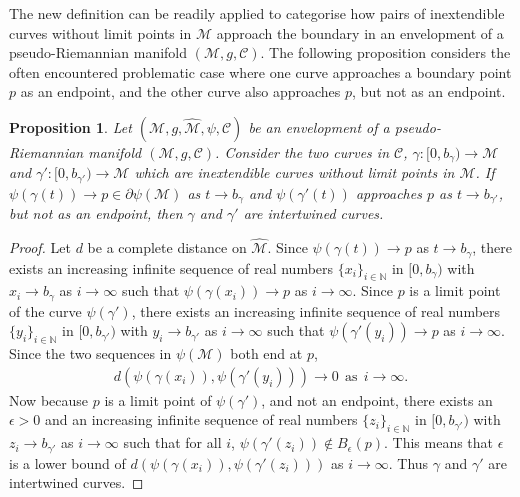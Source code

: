 \documentclass[pdflatex,sn-mathphys-num]{sn-jnl}
\newtheorem{prop}[theorem]{Proposition}
\theoremstyle{definition}
\begin{document}
The new definition can be readily applied to categorise how pairs of inextendible curves without limit points in $\mathcal{M}$ approach the boundary in an envelopment of a pseudo-Riemannian manifold  $(\mathcal{M},g,\mathcal{C})$. The following proposition considers the often encountered problematic case where one curve approaches a boundary point $p$ as an endpoint, and the other curve also approaches $p$, but not as an endpoint. 
\begin{prop}\label{prop:intertwined} 
    Let $(\mathcal{M},g,\hat{\mathcal{M}},\psi,\mathcal{C})$ be an envelopment of a pseudo-Riemannian manifold  $(\mathcal{M},g,\mathcal{C})$. Consider the two curves in $\mathcal{C}$, $\gamma:[0,b_{\gamma}) \rightarrow \mathcal{M}$ and $\gamma':[0,b_{\gamma'}) \rightarrow \mathcal{M}$ which are inextendible curves without limit points in $\mathcal{M}$. If $\psi(\gamma(t)) \rightarrow p \in  \partial\psi(\mathcal{M})$ as $t \rightarrow b_{\gamma}$ and $\psi(\gamma'(t))$ approaches $p$ as $t \rightarrow b_{\gamma'}$, but not as an endpoint, then $\gamma$ and $\gamma'$ are intertwined curves.
\end{prop}
\begin{proof}
    Let $d$ be a complete distance on $\hat{\mathcal{M}}$. Since $\psi(\gamma(t)) \rightarrow p$ as $t \rightarrow b_{\gamma}$, there exists an increasing infinite sequence of real numbers $\{x_i\}_{i \in \mathbb{N}}$ in $[0,b_{\gamma})$ with $x_i \rightarrow b_{\gamma}$ as $i \rightarrow \infty$ such that $\psi(\gamma(x_i)) \rightarrow p$ as $i \rightarrow \infty$. Since $p$ is a limit point of the curve $\psi(\gamma')$, there exists an increasing infinite sequence of real numbers $\{y_i\}_{i \in \mathbb{N}}$ in $[0,b_{\gamma'})$ with $y_i \rightarrow b_{\gamma'}$ as $i \rightarrow \infty$ such that $\psi(\gamma'(y_i)) \rightarrow p$ as $i \rightarrow \infty$. Since the two sequences in $\psi(\mathcal{M})$ both end at $p$, 
    \begin{align*}
        d(\psi(\gamma(x_i)),\psi(\gamma'(y_i))) \rightarrow 0~~\text{as}~~i \rightarrow \infty.
    \end{align*}
    Now because $p$ is a limit point of $\psi(\gamma')$, and not an endpoint, there exists an $\epsilon > 0$ and an increasing infinite sequence of real numbers $\{z_i\}_{i \in \mathbb{N}}$ in $[0,b_{\gamma'})$ with $z_i \rightarrow b_{\gamma'}$ as $i \rightarrow \infty$ such that for all $i$, $\psi(\gamma'(z_i)) \notin B_{\epsilon}(p)$. This means that $\epsilon$ is a lower bound of $d(\psi(\gamma(x_i)),\psi(\gamma'(z_i)))$ as $i \rightarrow \infty$. Thus $\gamma$ and $\gamma'$ are intertwined curves.
\end{proof}
\end{document}

